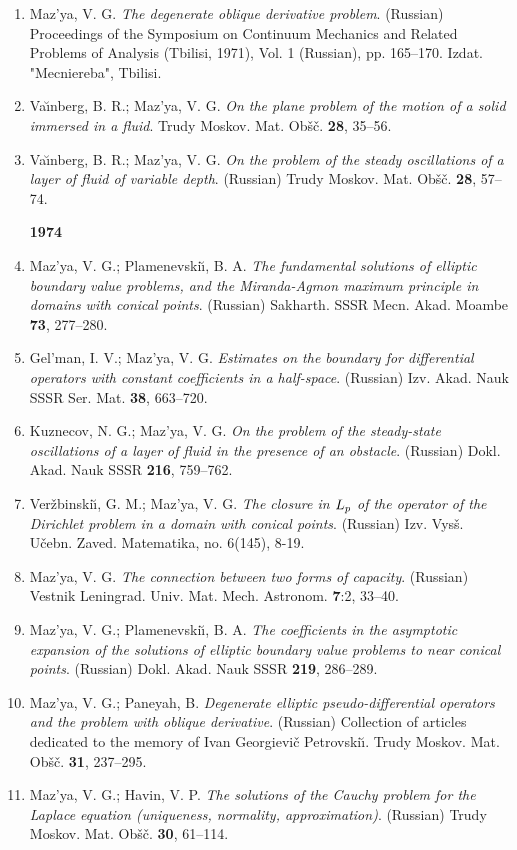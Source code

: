 \documentclass{article}
\begin{document}
\begin{enumerate}
\item Maz'ya, V. G. {\it The degenerate oblique derivative problem}.
(Russian) Proceedings of the Symposium on
Continuum Mechanics and
Related Problems of Analysis (Tbilisi, 1971), Vol. 1 (Russian), pp.
165--170. Izdat. "Mecniereba", Tbilisi.
\item Va{\u\i}nberg, B. R.; Maz'ya, V. G. {\it On the plane problem of
the
motion of a solid
immersed in a fluid}. Trudy Moskov. Mat. Ob\v s\v c. {\bf 28}, 35--56.
\item Va{\u\i}nberg, B. R.; Maz'ya, V. G. {\it On the problem of the
steady
oscillations of a layer of fluid of variable depth}.
(Russian) Trudy Moskov. Mat. Ob\v s\v c. {\bf 28}, 57--74.\hfill\break

{\bf 1974}
\item Maz'ya, V. G.; Plamenevski{\u\i}, B. A. {\it The fundamental
solutions of elliptic boundary value problems,
and the Miranda-Agmon maximum principle in domains with conical
points}.
(Russian) Sakharth. SSSR Mecn. Akad. Moambe {\bf 73},
277--280.
\item Gel'man, I. V.; Maz'ya, V. G. {\it Estimates on the boundary for
differential operators with constant
coefficients in a
half-space}. (Russian) Izv. Akad. Nauk SSSR Ser. Mat. {\bf 38},
663--720.
\item Kuznecov, N. G.; Maz'ya, V. G. {\it On the problem of the
steady-state oscillations of a layer of fluid in the presence of an
obstacle}. (Russian) Dokl. Akad. Nauk SSSR {\bf 216}, 759--762.
\item Ver\v zbinski{\u\i}, G. M.; Maz'ya, V. G. {\it The closure in
$L\sb{p}$ of the operator of the
Dirichlet problem in a domain with conical points}. (Russian) Izv.
Vys\v s.
U\v cebn. Zaved. Matematika, no. 6(145), 8-19.
\item Maz'ya, V. G. {\it The connection between two forms of
capacity}.
(Russian) Vestnik Leningrad. Univ. Mat. Mech. Astronom.
{\bf 7}:2, 33--40.
\item Maz'ya, V. G.; Plamenevski{\u\i}, B. A. {\it The coefficients in
the
asymptotic expansion of the
solutions of elliptic boundary value problems to near conical points}.
(Russian) Dokl. Akad. Nauk SSSR {\bf 219}, 286--289.
\item Maz'ya, V. G.; Paneyah, B. {\it Degenerate elliptic
pseudo-differential operators and the problem with oblique
derivative}.
(Russian) Collection of articles dedicated to the memory of Ivan
Georgievi\v c Petrovski{\u\i}. Trudy Moskov. Mat. Ob\v s\v c.
{\bf 31}, 237--295.
\item Maz'ya, V. G.; Havin, V. P. {\it The solutions of the Cauchy
problem
for the Laplace equation
(uniqueness, normality, approximation)}. (Russian) Trudy Moskov. Mat.
Ob\v
s\v c. {\bf 30}, 61--114.\hfill\break


\end{enumerate}
\end{document}
